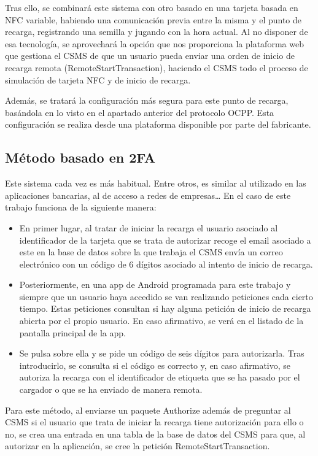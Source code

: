\documentclass[12pt,a4paper,onecolumn,oneside]{report}
\begin{document}
Tras ello, se combinará este sistema con otro basado en una tarjeta basada en NFC variable, habiendo una comunicación previa entre la misma y el punto de recarga, registrando una semilla y jugando con la hora actual. Al no disponer de esa tecnología, se aprovechará la opción que nos proporciona la plataforma web que gestiona el CSMS de que un usuario pueda enviar una orden de inicio de recarga remota (RemoteStartTransaction), haciendo el CSMS todo el proceso de simulación de tarjeta NFC y de inicio de recarga.

Además, se tratará la configuración más segura para este punto de recarga, basándola en lo visto en el apartado anterior del protocolo OCPP. Esta configuración se realiza desde una plataforma disponible por parte del fabricante.

\subsection{Método basado en 2FA}

Este sistema cada vez es más habitual. Entre otros, es similar al utilizado en las aplicaciones bancarias, al de acceso a redes de empresas… En el caso de este trabajo funciona de la siguiente manera:

\begin{itemize}
\item En primer lugar, al tratar de iniciar la recarga el usuario asociado al identificador de la tarjeta que se trata de autorizar recoge el email asociado a este en la base de datos sobre la que trabaja el CSMS envía un correo electrónico con un código de 6 dígitos asociado al intento de inicio de recarga.
\item Posteriormente, en una app de Android programada para este trabajo y siempre que un usuario haya accedido se van realizando peticiones cada cierto tiempo. Estas peticiones consultan si hay alguna petición de inicio de recarga abierta por el propio usuario. En caso afirmativo, se verá en el listado de la pantalla principal de la app. 
\item Se pulsa sobre ella y se pide un código de seis dígitos para autorizarla. Tras introducirlo, se consulta si el código es correcto y, en caso afirmativo, se autoriza la recarga con el identificador de etiqueta que se ha pasado por el cargador o que se ha enviado de manera remota.
\end{itemize}

Para este método, al enviarse un paquete Authorize además de preguntar al CSMS si el usuario que trata de iniciar la recarga tiene autorización para ello o no, se crea una entrada en una tabla de la base de datos del CSMS para que, al autorizar en la aplicación, se cree la petición RemoteStartTransaction.
\end{document}
